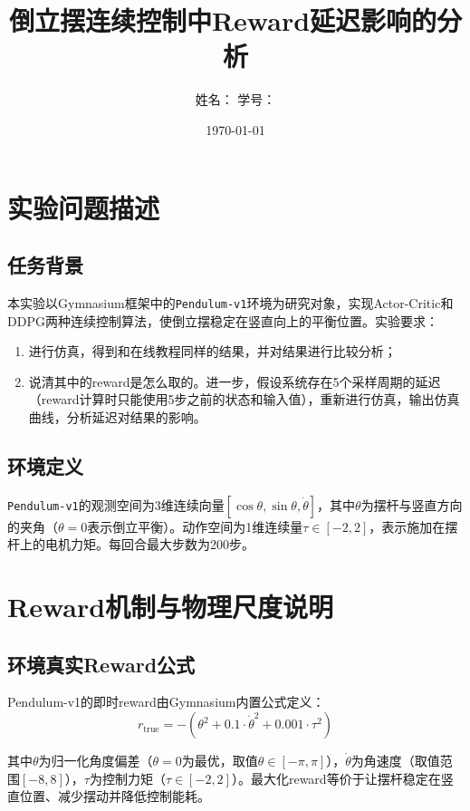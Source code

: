 \documentclass[UTF8,a4paper,12pt]{ctexart}
\title{\textbf{倒立摆连续控制中Reward延迟影响的分析}}
\author{姓名：\underline{\hspace{3cm}} \quad 学号：\underline{\hspace{3cm}}}
\date{\today}
\begin{document}
\maketitle

\section{实验问题描述}

\subsection{任务背景}

本实验以Gymnasium框架中的\texttt{Pendulum-v1}环境为研究对象，实现Actor-Critic和DDPG两种连续控制算法，使倒立摆稳定在竖直向上的平衡位置。实验要求：
\begin{enumerate}[leftmargin=2em]
  \item 进行仿真，得到和在线教程同样的结果，并对结果进行比较分析；
  \item 说清其中的reward是怎么取的。进一步，假设系统存在5个采样周期的延迟（reward计算时只能使用5步之前的状态和输入值），重新进行仿真，输出仿真曲线，分析延迟对结果的影响。
\end{enumerate}

\subsection{环境定义}

\texttt{Pendulum-v1}的观测空间为3维连续向量$[\cos\theta, \sin\theta, \dot{\theta}]$，其中$\theta$为摆杆与竖直方向的夹角（$\theta=0$表示倒立平衡）。动作空间为1维连续量$\tau \in [-2, 2]$，表示施加在摆杆上的电机力矩。每回合最大步数为200步。

\section{Reward机制与物理尺度说明}

\subsection{环境真实Reward公式}

Pendulum-v1的即时reward由Gymnasium内置公式定义：
\begin{equation}\label{eq:true_reward}
r_{\text{true}} = -(\theta^2 + 0.1 \cdot \dot{\theta}^2 + 0.001 \cdot \tau^2)
\end{equation}

其中$\theta$为归一化角度偏差（$\theta=0$为最优，取值$\theta\in[-\pi,\pi]$），$\dot{\theta}$为角速度（取值范围$[-8,8]$），$\tau$为控制力矩（$\tau\in[-2,2]$）。最大化reward等价于让摆杆稳定在竖直位置、减少摆动并降低控制能耗。
\end{document}
